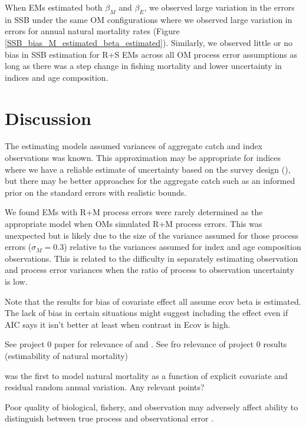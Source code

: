 \documentclass[
  12pt,
]{article}
\begin{document}
When EMs estimated both \(\beta_M\) and \(\beta_E\), we observed large variation in the errors in SSB under the same OM configurations where we observed large variation in errors for annual natural mortality rates (Figure \ref{SSB_bias_M_estimated_beta_estimated}). Similarly, we observed little or no bias in SSB estimation for R+S EMs across all OM process error assumptions as long as there was a step change in fishing mortality and lower uncertainty in indices and age composition.

\hypertarget{discussion}{%
\section*{Discussion}\label{discussion}}

The estimating models assumed variances of aggregate catch and index observations was known. This approximation may be appropriate for indices where we have a reliable estimate of uncertainty based on the survey design (), but there may be better approaches for the aggregate catch such as an informed prior on the standard errors with realistic bounds.

We found EMs with R+M process errors were rarely determined as the appropriate model when OMs simulated R+M process errors. This was unexpected but is likely due to the size of the variance assumed for those process errors (\(\sigma_M = 0.3\)) relative to the variances assumed for index and age composition observations. This is related to the difficulty in separately estimating observation and process error variances when the ratio of process to observation uncertainty is low.

Note that the results for bias of covariate effect all assume ecov beta is estimated. The lack of bias in certain situations might suggest including the effect even if AIC says it isn't better at least when contrast in Ecov is high.

See project 0 paper for relevance of \citet{lietal24} and \citet{liljestrandetal24}. See \citet{milleretal_inreview1} fro relevance of project 0 results (estimability of natural mortality)

\citet{derisoetal08} was the first to model natural mortality as a function of explicit covariate and residual random annual variation. Any relevant points?

Poor quality of biological, fishery, and observation may adversely affect ability to distinguish between true process and observational error \citep{puntetal14, stewartmonnahan17, croninpunt21, fischetal23, lietal_inreview_a}.
\end{document}
